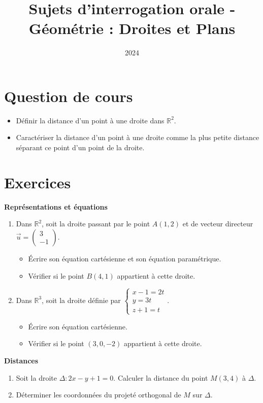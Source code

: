 \documentclass[10pt,a4paper]{article}
\title{Sujets d'interrogation orale - Géométrie : Droites et Plans}
\author{}
\date{2024}
\begin{document}
\maketitle

\section*{Question de cours}
\begin{itemize}
    \item Définir la distance d'un point à une droite dans $\mathbb{R}^2$.
    \item Caractériser la distance d'un point à une droite comme la plus petite distance séparant ce point d'un point de la droite.
\end{itemize}

\section*{Exercices}

\textbf{Représentations et équations}
\begin{enumerate}
    \item Dans $\mathbb{R}^2$, soit la droite passant par le point $A(1, 2)$ et de vecteur directeur $\vec{u} = \begin{pmatrix} 3 \\ -1 \end{pmatrix}$.
    \begin{itemize}
        \item Écrire son équation cartésienne et son équation paramétrique.
        \item Vérifier si le point $B(4, 1)$ appartient à cette droite.
    \end{itemize}
    \item Dans $\mathbb{R}^3$, soit la droite définie par $\begin{cases} x - 1 = 2t \\ y = 3t \\ z + 1 = t \end{cases}$.
    \begin{itemize}
        \item Écrire son équation cartésienne.
        \item Vérifier si le point $(3, 0, -2)$ appartient à cette droite.
    \end{itemize}
\end{enumerate}

\textbf{Distances}
\begin{enumerate}
    \item Soit la droite $\Delta : 2x - y + 1 = 0$. Calculer la distance du point $M(3, 4)$ à $\Delta$.
    \item Déterminer les coordonnées du projeté orthogonal de $M$ sur $\Delta$.
\end{enumerate}
\end{document}
